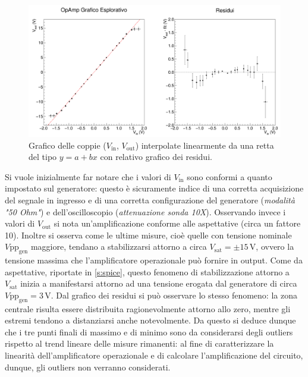 \documentclass[a4paper,11pt]{article} %
\begin{document}
\begin{figure}[H]
	\centering
	\includegraphics[width=15cm]{../Plots/Report_Plots/opamp_plot_alldata_eda.png}
	\caption{\small Grafico delle coppie ($V_{\text{in}}$, $V_{\text{out}}$) interpolate linearmente da una retta
	del tipo $y=a+bx$ con relativo grafico dei residui.}
	\label{i:opamp_eda}
\end{figure}

\noindent  Si vuole inizialmente far notare che i valori di $V_{\text{in}}$ sono conformi a quanto impostato sul
generatore: questo è sicuramente indice di una corretta acquisizione del segnale in ingresso e di una corretta
configurazione del generatore (\textit{modalità "50 Ohm"}) e dell'oscilloscopio (\textit{attenuazione sonda 10X}).
Osservando invece i valori di $V_{\text{out}}$ si nota un'amplificazione conforme alle aspettative (circa un fattore
10). Inoltre si osserva come le ultime misure, cioè quelle con tensione nominale $V\text{pp}_{\text{gen}}$ maggiore,
tendano a stabilizzarsi attorno a circa $V_{\text{sat}}=\pm15\,\si{\volt}$, ovvero la tensione massima che
l'amplificatore operazionale può fornire in output. Come da aspettative, riportate in \autoref{s:spice}, questo fenomeno
di stabilizzazione attorno a $V_{\text{sat}}$ inizia a manifestarsi attorno ad una tensione erogata dal generatore di
circa $V\text{pp}_{\text{gen}}=3\,\si{\volt}$. Dal grafico dei residui si può osservare lo stesso fenomeno: la zona
centrale risulta essere distribuita ragionevolmente attorno allo zero, mentre gli estremi tendono a distanziarsi anche
notevolmente. Da questo si deduce dunque che i tre punti finali di massimo e di minimo sono da considerarsi degli
outliers rispetto al trend lineare delle misure rimanenti: al fine di caratterizzare la linearità dell'amplificatore
operazionale e di calcolare l'amplificazione del circuito, dunque, gli outliers non verranno considerati.
\end{document}
